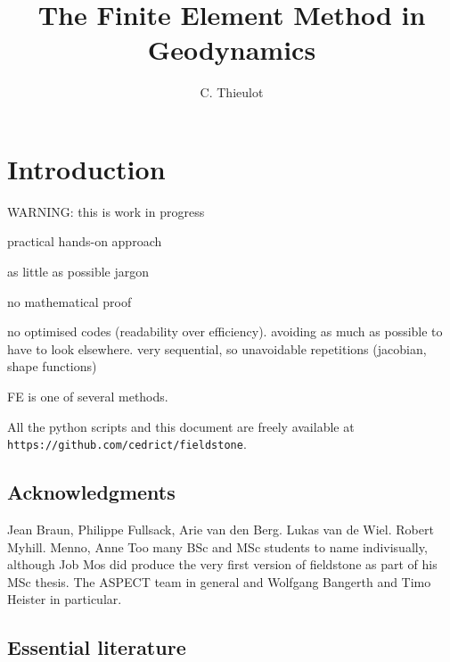 \documentclass[a4paper]{article}
\title{The Finite Element Method in Geodynamics}
\author{C. Thieulot}
\begin{document}
\maketitle

\tableofcontents

\newpage
\section{Introduction}

{\color{red} \huge WARNING: this is work in progress}

practical hands-on approach

as little as possible jargon

no mathematical proof

no optimised codes (readability over efficiency). avoiding as much as possible to have to look elsewhere.
very sequential, so unavoidable repetitions (jacobian, shape functions)

FE is one of several methods.

All the python scripts and this document are freely available at {\tt https://github.com/cedrict/fieldstone}.

\subsection{Acknowledgments}

Jean Braun, Philippe Fullsack, Arie van den Berg.
Lukas van de Wiel. Robert Myhill.
Menno, Anne
Too many BSc and MSc students to name indivisually, although Job Mos did produce the
very first version of fieldstone as part of his MSc thesis.
The ASPECT team in general and Wolfgang Bangerth and Timo Heister in particular.

\subsection{Essential literature}
\end{document}
